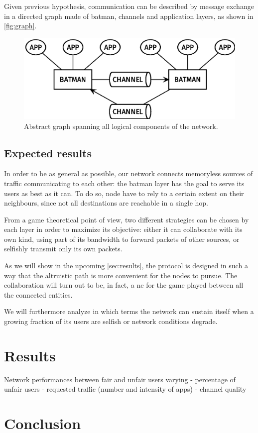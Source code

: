 \documentclass[conference]{IEEEtran}
\begin{document}
Given previous hypothesis, communication can be described by message exchange in
a directed graph made of \gls{batman}, channels and application layers, as shown
in \autoref{fig:graph}.

\begin{figure}[h]
  \centering
  \includegraphics[width=\linewidth]{figures/layers_diagram}
  \caption{Abstract graph spanning all logical components of the network.}
  \label{fig:graph}
\end{figure}

\subsection{Expected results}

In order to be as general as possible, our network connects memoryless sources
of traffic communicating to each other: the \gls{batman} layer has the goal to
serve its users as best as it can. To do so, node have to rely to a certain
extent on their neighbours, since not all destinations are reachable in a single
hop.

From a game theoretical point of view, two different strategies can be chosen by
each layer in order to maximize its objective: either it can collaborate with
its own kind, using part of its bandwidth to forward packets of other sources,
or selfishly transmit only its own packets.

As we will show in the upcoming \autoref{sec:results}, the protocol is designed
in such a way that the altruistic path is more convenient for the nodes to
pursue. The collaboration will turn out to be, in fact, a \gls{ne} for the game
played between all the connected entities.

We will furthermore analyze in which terms the network can sustain itself when a
growing fraction of its users are selfish or network conditions degrade.


\section{Results} \label{sec:results}

Network performances between fair and unfair users varying
- percentage of unfair users
- requested traffic (number and intensity of apps)
- channel quality

\section{Conclusion}


% 
\end{document}
